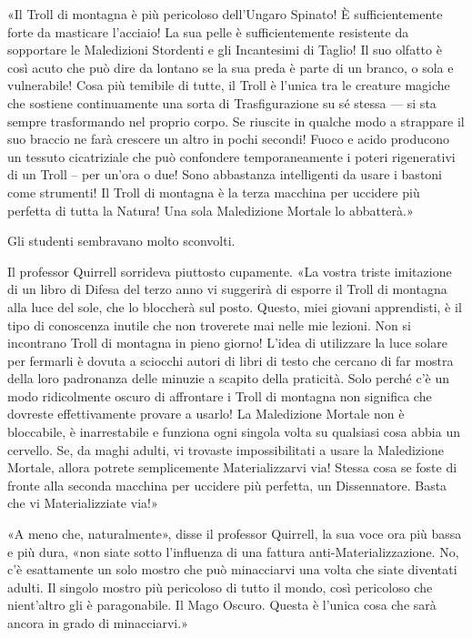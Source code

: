 «Il Troll di montagna è più pericoloso dell’Ungaro Spinato! È sufficientemente forte da masticare l’acciaio! La sua pelle è sufficientemente resistente da sopportare le Maledizioni Stordenti e gli Incantesimi di Taglio! Il suo olfatto è così acuto che può dire da lontano se la sua preda è parte di un branco, o sola e vulnerabile! Cosa più temibile di tutte, il Troll è l’unica tra le creature magiche che sostiene continuamente una sorta di Trasfigurazione su sé stessa — si sta sempre trasformando nel proprio corpo. Se riuscite in qualche modo a strappare il suo braccio ne farà crescere un altro in pochi secondi! Fuoco e acido producono un tessuto cicatriziale che può confondere temporaneamente i poteri rigenerativi di un Troll – per un’ora o due! Sono abbastanza intelligenti da usare i bastoni come strumenti! Il Troll di montagna è la terza macchina per uccidere più perfetta di tutta la Natura! Una sola Maledizione Mortale lo abbatterà.»

Gli studenti sembravano molto sconvolti.

Il professor Quirrell sorrideva piuttosto cupamente. «La vostra triste imitazione di un libro di Difesa del terzo anno vi suggerirà di esporre il Troll di montagna alla luce del sole, che lo bloccherà sul posto. Questo, miei giovani apprendisti, è il tipo di conoscenza inutile che non troverete mai nelle mie lezioni. Non si incontrano Troll di montagna in pieno giorno! L’idea di utilizzare la luce solare per fermarli è dovuta a sciocchi autori di libri di testo che cercano di far mostra della loro padronanza delle minuzie a scapito della praticità. Solo perché c’è un modo ridicolmente oscuro di affrontare i Troll di montagna non significa che dovreste effettivamente provare a usarlo! La Maledizione Mortale non è bloccabile, è inarrestabile e funziona ogni singola volta su qualsiasi cosa abbia un cervello. Se, da maghi adulti, vi trovaste impossibilitati a usare la Maledizione Mortale, allora potrete semplicemente Materializzarvi via! Stessa cosa se foste di fronte alla seconda macchina per uccidere più perfetta, un Dissennatore. Basta che vi Materializziate via!»

«A meno che, naturalmente», disse il professor Quirrell, la sua voce ora più bassa e più dura, «non siate sotto l’influenza di una fattura anti-Materializzazione. No, c’è esattamente un solo mostro che può minacciarvi una volta che siate diventati adulti. Il singolo mostro più pericoloso di tutto il mondo, così pericoloso che nient’altro gli è paragonabile. Il Mago Oscuro. Questa è l’unica cosa che sarà ancora in grado di minacciarvi.»

